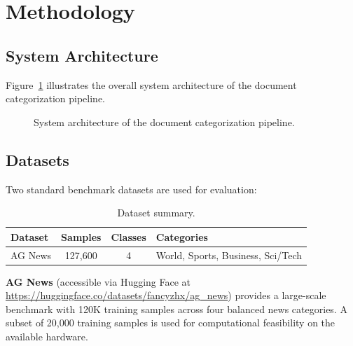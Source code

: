 \documentclass[12pt, a4paper]{article}
\begin{document}
\section{Methodology}

\subsection{System Architecture}
Figure~\ref{fig:architecture} illustrates the overall system architecture of the document categorization pipeline.

\begin{figure}[H]
    \centering
    \caption{System architecture of the document categorization pipeline.}
    \label{fig:architecture}
\end{figure}

\subsection{Datasets}
Two standard benchmark datasets are used for evaluation:

\begin{table}[H]
    \centering
    \caption{Dataset summary.}
    \label{tab:datasets}
    \begin{tabular}{lccl}
        \toprule
        \textbf{Dataset} & \textbf{Samples} & \textbf{Classes} & \textbf{Categories} \\
        \midrule
        AG News & 127,600 & 4 & World, Sports, Business, Sci/Tech \\
        \bottomrule
    \end{tabular}
\end{table}

\textbf{AG News} (accessible via Hugging Face at \url{https://huggingface.co/datasets/fancyzhx/ag_news}) provides a large-scale benchmark with 120K training samples across four balanced news categories. A subset of 20,000 training samples is used for computational feasibility on the available hardware.
\end{document}
